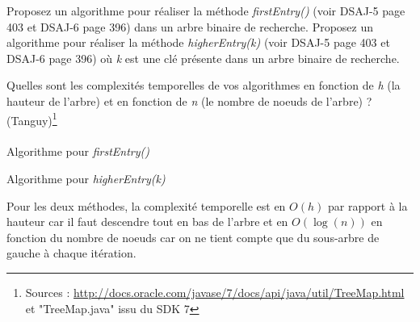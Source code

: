 Proposez un algorithme pour réaliser la méthode \textit{firstEntry()} (voir DSAJ-5
page 403 et DSAJ-6 page 396) dans un arbre binaire de recherche. Proposez un
algorithme pour réaliser la méthode \textit{higherEntry(k)} (voir DSAJ-5 page 403
et DSAJ-6 page 396) où \textit{k} est une clé présente dans un arbre binaire de recherche.

Quelles sont les complexités temporelles de vos algorithmes en fonction de \textit{h} (la
hauteur de l’arbre) et en fonction de \textit{n} (le nombre de noeuds de l’arbre) ?
(Tanguy)\footnote{Sources : \url{http://docs.oracle.com/javase/7/docs/api/java/util/TreeMap.html} et "TreeMap.java" issu du SDK 7}
\\
\\
Algorithme pour \textit{firstEntry()}

Algorithme pour \textit{higherEntry(k)}


Pour les deux méthodes, la complexité temporelle est en $O (h)$ par rapport à la hauteur car il faut descendre tout en bas de l'arbre et en $O (\log (n))$ en fonction du nombre de noeuds car on ne tient compte que du sous-arbre de gauche à chaque itération.